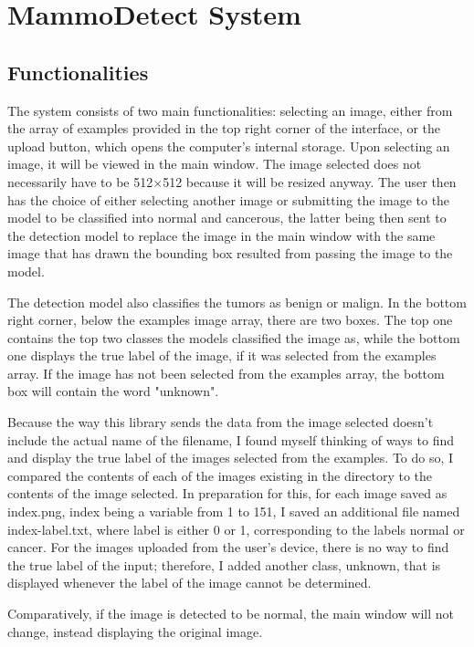 \chapter{MammoDetect System}
\label{chap:ch5}

\section{Functionalities}
The system consists of two main functionalities: selecting an image, either from the array of examples provided in the top right corner of the interface, or the upload button, which opens the computer's internal storage. Upon selecting an image, it will be viewed in the main window. The image selected does not necessarily have to be 512$\times$512 because it will be resized anyway. The user then has the choice of either selecting another image or submitting the image to the model to be classified into normal and cancerous, the latter being then sent to the detection model to replace the image in the main window with the same image that has drawn the bounding box resulted from passing the image to the model. 

The detection model also classifies the tumors as benign or malign. In the bottom right corner, below the examples image array, there are two boxes. The top one contains the top two classes the models classified the image as, while the bottom one displays the true label of the image, if it was selected from the examples array. If the image has not been selected from the examples array, the bottom box will contain the word "unknown".

Because the way this library sends the data from the image selected doesn't include the actual name of the filename, I found myself thinking of ways to find and display the true label of the images selected from the examples. To do so, I compared the contents of each of the images existing in the directory to the contents of the image selected. In preparation for this, for each image saved as index.png, index being a variable from 1 to 151, I saved an additional file named index-label.txt, where label is either 0 or 1, corresponding to the labels normal or cancer. For the images uploaded from the user's device, there is no way to find the true label of the input; therefore, I added another class, unknown, that is displayed whenever the label of the image cannot be determined.

Comparatively, if the image is detected to be normal, the main window will not change, instead displaying the original image.

